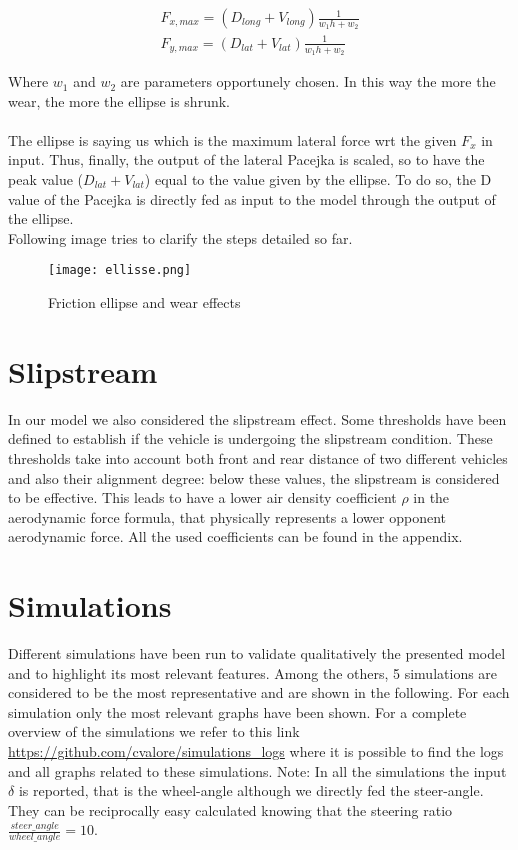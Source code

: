 \documentclass{report}
\let\Oldsection\section
\renewcommand{\section}{\FloatBarrier\Oldsection}
\begin{document}
\begin{equation}
\begin{aligned}
F_{x,max} = (D_{long} + V_{long}) \frac{1}{w_1 h + w_2}\\
F_{y,max} = (D_{lat} + V_{lat}) \frac{1}{w_1 h + w_2}
\end{aligned}
\end{equation}

Where $w_1$ and $w_2$ are parameters opportunely chosen. In this way the more the wear, the more the ellipse is shrunk.\\\\
The ellipse is saying us which is the maximum lateral force wrt the given $F_x$ in input. Thus, finally, the output of the lateral Pacejka is scaled, so to have the peak value ($D_{lat}+V_{lat}$) equal to the value given by the ellipse. To do so, the D value of the Pacejka is directly fed as input to the model through the output of the ellipse.\\Following image tries to clarify the steps detailed so far.

\begin{figure}[h!]
    \centering
    \texttt{[image: ellisse.png]}
    \caption{Friction ellipse and wear effects}
    \label{fig:ellisse}
\end{figure}

\newpage

\section{Slipstream}
In our model we also considered the slipstream effect. Some thresholds have been defined to establish if the vehicle is undergoing the slipstream condition. These thresholds take into account both front and rear distance of two different vehicles and also their alignment degree: below these values, the slipstream is considered to be effective. This leads to have a lower air density coefficient $\rho$ in the aerodynamic force formula, that physically represents a lower opponent aerodynamic force. All the used coefficients can be found in the appendix. 

\section{Simulations}
Different simulations have been run to validate qualitatively the presented model and to highlight its most relevant features. Among the others, 5 simulations are considered to be the most representative and are shown in the following. For each simulation only the most relevant graphs have been shown. For a complete overview of the simulations we refer to this link \url{https://github.com/cvalore/simulations\_logs} where it is possible to find the logs and all graphs related to these simulations.
Note: In all the simulations the input $\delta$ is reported, that is the wheel-angle although we directly fed the steer-angle. They can be reciprocally easy calculated knowing that the steering ratio $\frac{steer\_angle}{wheel\_angle} = 10$.
\end{document}
